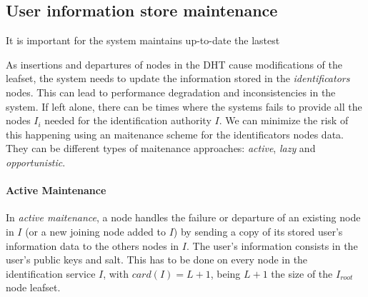
\subsection{User information store maintenance}
\label{sec:lazy_node_maintenance}

It is important for the system maintains up-to-date the lastest 

As insertions and departures of nodes in the DHT cause modifications of the
leafset, the system needs to update the information stored in the
\textit{identificators} nodes. This can lead to performance degradation and inconsistencies in the
system. If left alone, there can be times where the systems
fails to provide all the nodes $I_i$ needed for the identification authority
$I$. We can minimize the risk of this happening using an maitenance scheme for
the identificators nodes data. They can be different types of maitenance approaches:
\textit{active}, \textit{lazy} and \textit{opportunistic}.

\paragraph{Active Maintenance}
  In \textit{active maitenance}, a
node handles the failure or departure of an existing node in $I$ (or a new
joining node added to $I$) by sending a copy of its stored user's
information data to the others nodes in $I$.
The user's information consists in the user's public keys and salt. This has to be done on every node in the identification service
$I$, with $card(I) = L+1$, being $L+1$ the size of the $I_{root}$ node leafset.

